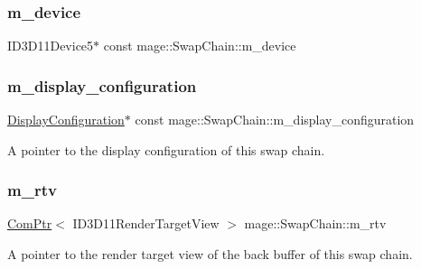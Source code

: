 \subsubsection{\texorpdfstring{m\+\_\+device}{m\_device}}
{\footnotesize\ttfamily I\+D3\+D11\+Device5$\ast$ const mage\+::\+Swap\+Chain\+::m\+\_\+device\hspace{0.3cm}{\ttfamily [private]}}

\hypertarget{classmage_1_1_swap_chain_ac1aa833943aa6bfe464da32316f7096f}{}\label{classmage_1_1_swap_chain_ac1aa833943aa6bfe464da32316f7096f} 
\subsubsection{\texorpdfstring{m\+\_\+display\+\_\+configuration}{m\_display\_configuration}}
{\footnotesize\ttfamily \hyperlink{classmage_1_1_display_configuration}{Display\+Configuration}$\ast$ const mage\+::\+Swap\+Chain\+::m\+\_\+display\+\_\+configuration\hspace{0.3cm}{\ttfamily [private]}}

A pointer to the display configuration of this swap chain. \hypertarget{classmage_1_1_swap_chain_a87610dab11ac73b2e5c2510e013640ac}{}\label{classmage_1_1_swap_chain_a87610dab11ac73b2e5c2510e013640ac} 
\subsubsection{\texorpdfstring{m\+\_\+rtv}{m\_rtv}}
{\footnotesize\ttfamily \hyperlink{namespacemage_ae74f374780900893caa5555d1031fd79}{Com\+Ptr}$<$ I\+D3\+D11\+Render\+Target\+View $>$ mage\+::\+Swap\+Chain\+::m\+\_\+rtv\hspace{0.3cm}{\ttfamily [private]}}

A pointer to the render target view of the back buffer of this swap chain. \hypertarget{classmage_1_1_swap_chain_a826bde72349ca10f7c60ca39d68dc2b2}{}\label{classmage_1_1_swap_chain_a826bde72349ca10f7c60ca39d68dc2b2} 
